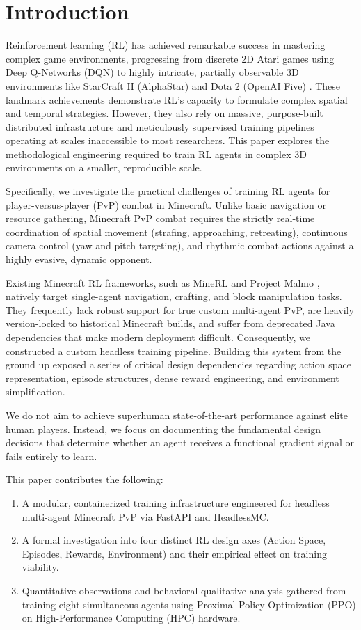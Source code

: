 \documentclass[conference]{IEEEtran}
\begin{document}
\section{Introduction}
Reinforcement learning (RL) has achieved remarkable success in mastering complex game environments, progressing from discrete 2D Atari games using Deep Q-Networks (DQN) \cite{mnih2015human} to highly intricate, partially observable 3D environments like StarCraft II (AlphaStar) \cite{vinyals2019grandmaster} and Dota 2 (OpenAI Five) \cite{berner2019dota}. These landmark achievements demonstrate RL's capacity to formulate complex spatial and temporal strategies. However, they also rely on massive, purpose-built distributed infrastructure and meticulously supervised training pipelines operating at scales inaccessible to most researchers. This paper explores the methodological engineering required to train RL agents in complex 3D environments on a smaller, reproducible scale.

Specifically, we investigate the practical challenges of training RL agents for player-versus-player (PvP) combat in Minecraft. Unlike basic navigation or resource gathering, Minecraft PvP combat requires the strictly real-time coordination of spatial movement (strafing, approaching, retreating), continuous camera control (yaw and pitch targeting), and rhythmic combat actions against a highly evasive, dynamic opponent. 

Existing Minecraft RL frameworks, such as MineRL \cite{guss2019minerl} and Project Malmo \cite{johnson2016malmo}, natively target single-agent navigation, crafting, and block manipulation tasks. They frequently lack robust support for true custom multi-agent PvP, are heavily version-locked to historical Minecraft builds, and suffer from deprecated Java dependencies that make modern deployment difficult. Consequently, we constructed a custom headless training pipeline. Building this system from the ground up exposed a series of critical design dependencies regarding action space representation, episode structures, dense reward engineering, and environment simplification. 

We do not aim to achieve superhuman state-of-the-art performance against elite human players. Instead, we focus on documenting the fundamental design decisions that determine whether an agent receives a functional gradient signal or fails entirely to learn. 

This paper contributes the following:
\begin{enumerate}
    \item A modular, containerized training infrastructure engineered for headless multi-agent Minecraft PvP via FastAPI and HeadlessMC.
    \item A formal investigation into four distinct RL design axes (Action Space, Episodes, Rewards, Environment) and their empirical effect on training viability.
    \item Quantitative observations and behavioral qualitative analysis gathered from training eight simultaneous agents using Proximal Policy Optimization (PPO) \cite{schulman2017proximal} on High-Performance Computing (HPC) hardware.
\end{enumerate}
\end{document}
